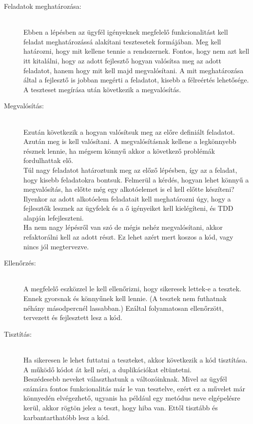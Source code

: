 \begin{description}
\item[Feladatok meghatározása:]\hfill\\
     Ebben a lépésben az ügyfél igényeknek megfelelő funkcionalitást kell feladat meghatározássá alakítani tesztesetek formájában. Meg kell határozni, hogy mit kellene tennie a rendszernek. Fontos, hogy nem azt kell itt kitalálni, hogy az adott fejlesztő hogyan valósítsa meg az adott feladatot, hanem hogy mit kell majd megvalósítani. A mit meghatározása által a fejlesztő is jobban megérti a feladatot, kisebb a félreértés lehetősége. A teszteset megírása után következik a megvalósítás.
\hfill\\
\item[Megvalósítás:]\hfill\\
     Ezután következik a hogyan valósítsuk meg az előre definiált feladatot. Azután meg is kell valósítani. A megvalósításnak kellene a legkönnyebb résznek lennie, ha mégsem könnyű akkor a következő problémák fordulhattak elő. \\
Túl nagy feladatot határoztunk meg az előző lépésben, így az a feladat, hogy kisebb feladatokra bontsuk. Felmerül a kérdés, hogyan lehet könnyű a megvalósítás, ha előtte még egy alkotóelemet is el kell előtte készíteni? Ilyenkor az adott alkotóelem feladatait kell meghatározni úgy, hogy a fejlesztők lesznek az ügyfelek és a ő igényeiket kell kielégíteni, és TDD alapján lefejleszteni.\\
Ha nem nagy lépésről van szó de mégis nehéz megvalósítani, akkor refaktorálni kell az adott részt. Ez lehet azért mert koszos a kód, vagy nincs jól megtervezve.
\hfill\\
\item[Ellenőrzés:]\hfill\\
     A megfelelő eszközzel le kell ellenőrizni, hogy sikeresek lettek-e a tesztek. Ennek gyorsnak és könnyűnek kell lennie. (A tesztek nem futhatnak néhány másodpercnél lassabban.) Ezáltal folyamatosan ellenőrzött, tervezett és fejlesztett lesz a kód.
\hfill\\
\item[Tisztítás:]\hfill\\
Ha sikeresen le lehet futtatni a teszteket, akkor következik a kód tisztítása. A működő kódot át kell nézi, a duplikációkat eltüntetni.\\ Beszédesebb neveket választhatunk a változóinknak. Mivel az ügyfél számára fontos funkcionalitás már le van tesztelve, ezért ez a művelet már könnyedén elvégezhető, ugyanis ha például egy metódus neve elgépelésre kerül, akkor rögtön jelez a teszt, hogy hiba van. Ettől tisztább és karbantarthatóbb lesz a kód.
\end{description}

